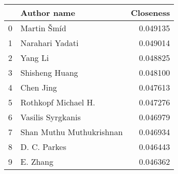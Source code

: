 \begin{tabular}{llr}
\toprule
{} &               Author name &  Closeness \\
\midrule
0 &               Martin Šmíd &   0.049135 \\
1 &           Narahari Yadati &   0.049014 \\
2 &                   Yang Li &   0.048825 \\
3 &            Shisheng Huang &   0.048100 \\
4 &                Chen  Jing &   0.047613 \\
5 &      Rothkopf  Michael H. &   0.047276 \\
6 &         Vasilis Syrgkanis &   0.046979 \\
7 &  Shan Muthu Muthukrishnan &   0.046934 \\
8 &              D. C. Parkes &   0.046443 \\
9 &                  E. Zhang &   0.046362 \\
\bottomrule
\end{tabular}

